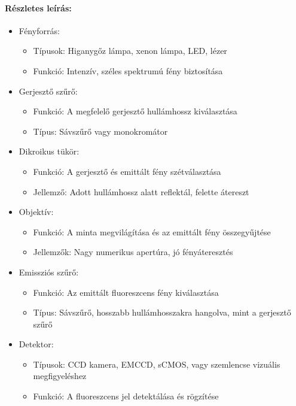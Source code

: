 \documentclass[a4paper,12pt]{article}
\begin{document}
\paragraph{Részletes leírás:} \begin{itemize} \item Fényforrás: \begin{itemize} \item Típusok: Higanygőz lámpa, xenon lámpa, LED, lézer \item Funkció: Intenzív, széles spektrumú fény biztosítása \end{itemize} \item Gerjesztő szűrő: \begin{itemize} \item Funkció: A megfelelő gerjesztő hullámhossz kiválasztása \item Típus: Sávszűrő vagy monokromátor \end{itemize} \item Dikroikus tükör: \begin{itemize} \item Funkció: A gerjesztő és emittált fény szétválasztása \item Jellemző: Adott hullámhossz alatt reflektál, felette átereszt \end{itemize} \item Objektív: \begin{itemize} \item Funkció: A minta megvilágítása és az emittált fény összegyűjtése \item Jellemzők: Nagy numerikus apertúra, jó fényáteresztés \end{itemize} \item Emissziós szűrő: \begin{itemize} \item Funkció: Az emittált fluoreszcens fény kiválasztása \item Típus: Sávszűrő, hosszabb hullámhosszakra hangolva, mint a gerjesztő szűrő \end{itemize} \item Detektor: \begin{itemize} \item Típusok: CCD kamera, EMCCD, sCMOS, vagy szemlencse vizuális megfigyeléshez \item Funkció: A fluoreszcens jel detektálása és rögzítése \end{itemize} \end{itemize}
\end{document}
